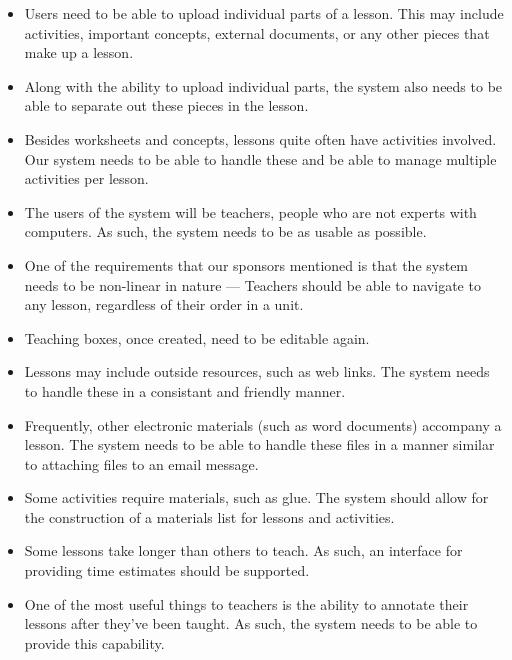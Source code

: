 \documentclass[12pt,titlepage]{article}
\begin{document}
\begin{itemize}
\item Users need to be able to upload individual parts of a lesson.  This may
      include activities, important concepts, external documents, or any other
      pieces that make up a lesson.

\item Along with the ability to upload individual parts, the system also needs
      to be able to separate out these pieces in the lesson.

\item Besides worksheets and concepts, lessons quite often have activities
      involved.  Our system needs to be able to handle these and be able
      to manage multiple activities per lesson.

\item The users of the system will be teachers, people who are not experts
      with computers.  As such, the system needs to be as usable as possible.

\item One of the requirements that our sponsors mentioned is that the system
      needs to be non-linear in nature --- Teachers should be able to navigate
      to any lesson, regardless of their order in a unit.

\item Teaching boxes, once created, need to be editable again.

\item Lessons may include outside resources, such as web links.  The system
      needs to handle these in a consistant and friendly manner.

\item Frequently, other electronic materials (such as word documents) accompany
      a lesson.  The system needs to be able to handle these files in a manner
      similar to attaching files to an email message.

\item Some activities require materials, such as glue.  The system should allow
      for the construction of a materials list for lessons and activities.

\item Some lessons take longer than others to teach.  As such, an interface for
      providing time estimates should be supported.

\item One of the most useful things to teachers is the ability to annotate their
      lessons after they've been taught.  As such, the system needs to be able
      to provide this capability.
\end{itemize}
\end{document}
